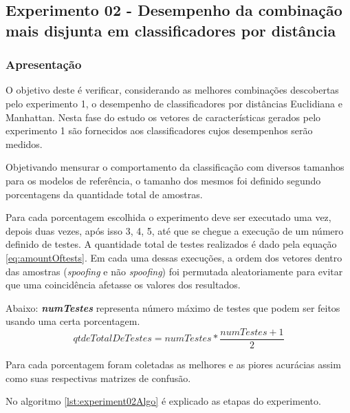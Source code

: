 \begin{myenv}{1.5}
			\subsection{Experimento 02 - Desempenho da combinação mais disjunta em classificadores por distância}
			\label{chap:propApproach:sec:Experimento01}
				\subsubsection{Apresentação}
					\par O objetivo deste é verificar, considerando as melhores combinações descobertas pelo experimento 1, o desempenho de classificadores por distâncias Euclidiana e Manhattan. Nesta fase do estudo os vetores de características gerados pelo experimento 1 são fornecidos aos classificadores cujos desempenhos serão medidos.
					
					\par Objetivando mensurar o comportamento da classificação com diversos tamanhos para os modelos de referência, o tamanho dos mesmos foi definido segundo porcentagens da quantidade total de amostras.
					
					\par Para cada porcentagem escolhida o experimento deve ser executado uma vez, depois duas vezes, após isso 3, 4, 5, até que se chegue a execução de um número definido de testes. A quantidade total de testes realizados é dado pela equação \ref{eq:amountOftests}. Em cada uma dessas execuções, a ordem dos vetores dentro das amostras (\textit{spoofing} e não \textit{spoofing}) foi permutada aleatoriamente para evitar que uma coincidência afetasse os valores dos resultados.
					
					\par Abaixo: \textit{\textbf{numTestes}} representa número máximo de testes que podem ser feitos usando uma certa porcentagem.
					\begin{equation}
						\label{eq:amountOftests}
						qtdeTotalDeTestes= numTestes * \dfrac{numTestes + 1}{2}
					\end{equation}
					
					\par Para cada porcentagem foram coletadas as melhores e as piores acurácias assim como suas respectivas matrizes de confusão.
					
					\par No algoritmo \ref{lst:experiment02Algo} é explicado as etapas do experimento.
									

\end{myenv}
